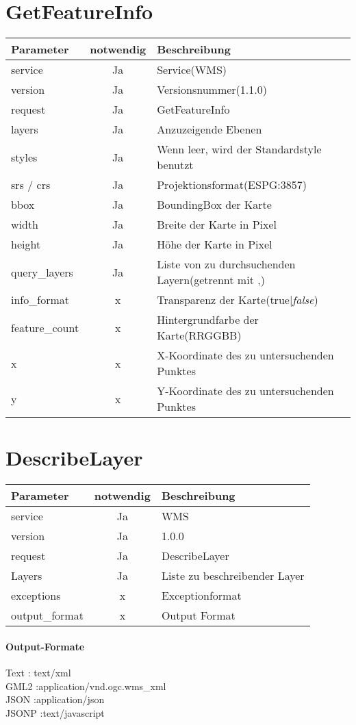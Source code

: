\section{GetFeatureInfo}
\begin{tabular}{lcl}
\textbf{Parameter} & \textbf{notwendig} & \textbf{Beschreibung}\\
\hline 
service & Ja & Service(WMS) \\ 
\hline 
version & Ja & Versionsnummer(1.1.0) \\ 
\hline 
request & Ja & GetFeatureInfo \\ 
\hline 
layers & Ja & Anzuzeigende Ebenen \\ 
\hline 
styles & Ja & Wenn leer, wird der Standardstyle benutzt \\ 
\hline 
srs / crs & Ja & Projektionsformat(ESPG:3857) \\ 
\hline 
bbox & Ja & BoundingBox der Karte \\ 
\hline 
width & Ja & Breite der Karte in Pixel \\ 
\hline 
height & Ja & H\"ohe der Karte in Pixel \\ 
\hline 
query\_layers & Ja & Liste von zu durchsuchenden Layern(getrennt mit ,)\\
\hline 
info\_format & x & Transparenz der Karte(true|\emph{false}) \\ 
\hline 
feature\_count & x & Hintergrundfarbe der Karte(RRGGBB) \\ 
\hline 
x & x & X-Koordinate des zu untersuchenden Punktes \\ 
\hline 
y & x & Y-Koordinate des zu untersuchenden Punktes \\ 
\hline 
\end{tabular} 

\section{DescribeLayer}
\begin{tabular}{lcl} 
\textbf{Parameter} & \textbf{notwendig} & \textbf{Beschreibung} \\ 
\hline 
service & Ja & WMS \\ 
\hline 
version & Ja & 1.0.0 \\ 
\hline 
request & Ja & DescribeLayer \\ 
\hline 
Layers & Ja & Liste zu beschreibender Layer \\ 
\hline 
exceptions & x & Exceptionformat \\ 
\hline 
output\_format & x & Output Format \\ 
\hline 
\end{tabular} 
\paragraph*{Output-Formate\\}
Text : text/xml\\
GML2 :application/vnd.ogc.wms\_xml\\
JSON :application/json\\
JSONP :text/javascript\\
